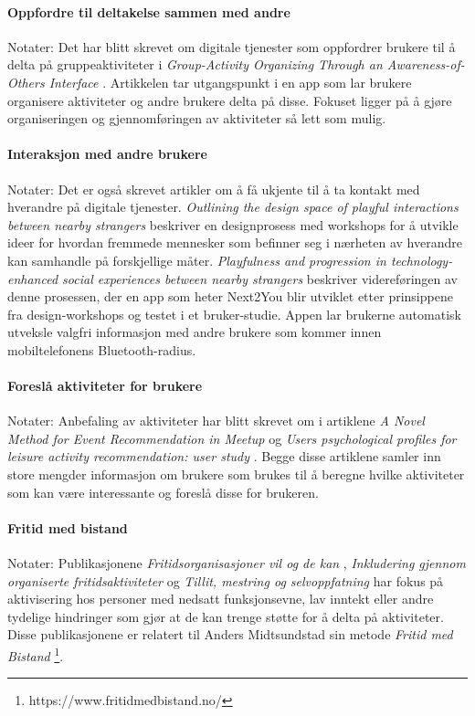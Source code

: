 \paragraph{Oppfordre til deltakelse sammen med andre}
Notater:
Det har blitt skrevet om digitale tjenester som oppfordrer brukere til å delta på gruppeaktiviteter i {\em Group-Activity Organizing Through an Awareness-of-Others Interface} \cite{AWARENESS:3:CSCW18}. Artikkelen tar utgangspunkt i en app som lar brukere organisere aktiviteter og andre brukere delta på disse. Fokuset ligger på å gjøre organiseringen og gjennomføringen av aktiviteter så lett som mulig.

\paragraph{Interaksjon med andre brukere}
Notater:
Det er også skrevet artikler om å få ukjente til å ta kontakt med hverandre på digitale tjenester. {\em Outlining the design space of playful interactions between nearby strangers} \cite{NEARBY:5:AM16} beskriver en designprosess med workshops for å utvikle ideer for hvordan fremmede mennesker som befinner seg i nærheten av hverandre kan samhandle på forskjellige måter. {\em Playfulness and progression in technology-enhanced social experiences between nearby strangers} \cite{PLAYFUL:6:NORDICHI18} beskriver videreføringen av denne prosessen, der en app som heter Next2You blir utviklet etter prinsippene fra design-workshops og testet i et bruker-studie. Appen lar brukerne automatisk utveksle valgfri informasjon med andre brukere som kommer innen mobiltelefonens Bluetooth-radius.

\paragraph{Foreslå aktiviteter for brukere}
Notater:
Anbefaling av aktiviteter har blitt skrevet om i artiklene {\em A Novel Method for Event Recommendation in Meetup} \cite{MEETUP:7:ASONAM17} og {\em Users psychological profiles for leisure activity recommendation: user study} \cite{PROFILES:10:CITREC17}. Begge disse artiklene samler inn store mengder informasjon om brukere som brukes til å beregne hvilke aktiviteter som kan være interessante og foreslå disse for brukeren.

\paragraph{Fritid med bistand}
Notater:
Publikasjonene {\em Fritidsorganisasjoner vil og de kan} \cite{FRITID:12}, {\em Inkludering gjennom organiserte fritidsaktiviteter} \cite{INKLUDERING:11} og {\em Tillit, mestring og selvoppfatning} \cite{TILLIT:13} har fokus på aktivisering hos personer med nedsatt funksjonsevne, lav inntekt eller andre tydelige hindringer som gjør at de kan trenge støtte for å delta på aktiviteter. Disse publikasjonene er relatert til Anders Midtsundstad sin metode {\em Fritid med Bistand} \footnote{https://www.fritidmedbistand.no/}. 
